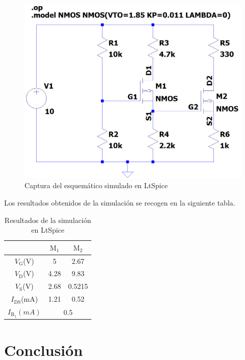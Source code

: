 \documentclass[11pt,a4paper]{article}
\begin{document}
		\begin{figure}[!hbt]
			\centering
			\includegraphics[width=0.5\columnwidth]{figuras/simulacion_esquematico}
			\caption{Captura del esquemático simulado en LtSpice}
			\label{simulacion_esquematico}
		\end{figure}

		Los resultados obtenidos de la simulación se recogen en la siguiente tabla.

		\begin{table}[!hbt]
			\centering
			\caption{Resultados de la simulación en LtSpice}
			\begin{tabular}{c | c c}
				& $\mathrm{M}_1$ & $\mathrm{M}_2$ \\
				\hline\hline
				$V_\mathrm{G}$(V) & 5 & 2.67 \\
				$V_\mathrm{D}$(V) & 4.28 & 9.83 \\
				$V_\mathrm{S}$(V) & 2.68 & 0.5215 \\
				$I_{\mathrm{DS}}$(mA) & 1.21 & 0.52 \\
				\hline\hline
				$I_{\mathrm{R}_1}(mA)$ & \multicolumn{2}{c}{0.5}
			\end{tabular}
			\label{tabla_resultadossim}
		\end{table}

\section{Conclusión}
\end{document}
